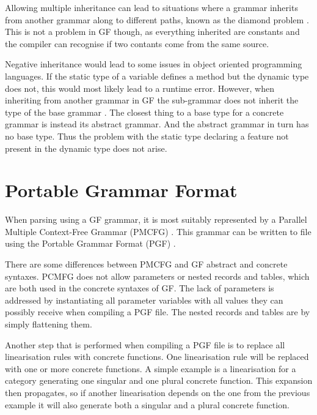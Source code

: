Allowing multiple inheritance can lead to situations where a grammar inherits from another grammar along to different paths, known as the diamond problem \cite{diamongproblem}. This is not a problem in GF though, as everything inherited are constants and the compiler can recognise if two contants come from the same source\cite{gfdiamondsolution}.

Negative inheritance would lead to some issues in object oriented programming languages. If the static type \cite{statictype} of a variable defines a method but the dynamic type \cite{dynamictype} does not, this would most likely lead to a runtime error. However, when inheriting from another grammar in GF the sub-grammar does not inherit the type of the base grammar \cite{grammartype}. The closest thing to a base type for a concrete grammar is instead its abstract grammar. And the abstract grammar in turn has no base type. Thus the problem with the static type declaring a feature not present in the dynamic type does not arise.

\section{Portable Grammar Format}
When parsing using a GF grammar, it is most suitably represented by a Parallel Multiple Context-Free Grammar (PMCFG) \cite{pmcfg}. This grammar can be written to file using the Portable Grammar Format (PGF) \cite{Angelov}.

There are some differences between PMCFG and GF abstract and concrete syntaxes. PCMFG does not allow parameters or nested records and tables, which are both used in the concrete syntaxes of GF. The lack of parameters is addressed by instantiating all parameter variables with all values they can possibly receive when compiling a PGF file. The nested records and tables are by simply flattening them.

Another step that is performed when compiling a PGF file is to replace all linearisation rules with concrete functions. One linearisation rule will be replaced with one or more concrete functions. A simple example is a linearisation for a category generating one singular and one plural concrete function. This expansion then propagates, so if another linearisation depends on the one from the previous example it will also generate both a singular and a plural concrete function.
